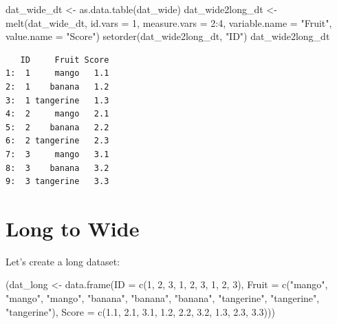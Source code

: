 \documentclass[
]{book}
\newenvironment{Shaded}{\begin{snugshade}}{\end{snugshade}}
\newcommand{\AttributeTok}[1]{\textcolor[rgb]{0.77,0.63,0.00}{#1}}
\newcommand{\DecValTok}[1]{\textcolor[rgb]{0.00,0.00,0.81}{#1}}
\newcommand{\FloatTok}[1]{\textcolor[rgb]{0.00,0.00,0.81}{#1}}
\newcommand{\FunctionTok}[1]{\textcolor[rgb]{0.00,0.00,0.00}{#1}}
\newcommand{\NormalTok}[1]{#1}
\newcommand{\OtherTok}[1]{\textcolor[rgb]{0.56,0.35,0.01}{#1}}
\newcommand{\SpecialCharTok}[1]{\textcolor[rgb]{0.00,0.00,0.00}{#1}}
\newcommand{\StringTok}[1]{\textcolor[rgb]{0.31,0.60,0.02}{#1}}
\begin{document}
\begin{Shaded}
\begin{Highlighting}[]
\NormalTok{dat\_wide\_dt }\OtherTok{\textless{}{-}} \FunctionTok{as.data.table}\NormalTok{(dat\_wide)}
\NormalTok{dat\_wide2long\_dt }\OtherTok{\textless{}{-}} \FunctionTok{melt}\NormalTok{(dat\_wide\_dt,}
                         \AttributeTok{id.vars =} \DecValTok{1}\NormalTok{,}
                         \AttributeTok{measure.vars =} \DecValTok{2}\SpecialCharTok{:}\DecValTok{4}\NormalTok{,}
                         \AttributeTok{variable.name =} \StringTok{"Fruit"}\NormalTok{,}
                         \AttributeTok{value.name =} \StringTok{"Score"}\NormalTok{)}
\FunctionTok{setorder}\NormalTok{(dat\_wide2long\_dt, }\StringTok{"ID"}\NormalTok{)}
\NormalTok{dat\_wide2long\_dt}
\end{Highlighting}
\end{Shaded}

\begin{verbatim}
   ID     Fruit Score
1:  1     mango   1.1
2:  1    banana   1.2
3:  1 tangerine   1.3
4:  2     mango   2.1
5:  2    banana   2.2
6:  2 tangerine   2.3
7:  3     mango   3.1
8:  3    banana   3.2
9:  3 tangerine   3.3
\end{verbatim}

\hypertarget{long-to-wide}{%
\section{Long to Wide}\label{long-to-wide}}

Let's create a long dataset:

\begin{Shaded}
\begin{Highlighting}[]
\NormalTok{(dat\_long }\OtherTok{\textless{}{-}} \FunctionTok{data.frame}\NormalTok{(}\AttributeTok{ID =} \FunctionTok{c}\NormalTok{(}\DecValTok{1}\NormalTok{, }\DecValTok{2}\NormalTok{, }\DecValTok{3}\NormalTok{, }\DecValTok{1}\NormalTok{, }\DecValTok{2}\NormalTok{, }\DecValTok{3}\NormalTok{, }\DecValTok{1}\NormalTok{, }\DecValTok{2}\NormalTok{, }\DecValTok{3}\NormalTok{),}
                       \AttributeTok{Fruit =} \FunctionTok{c}\NormalTok{(}\StringTok{"mango"}\NormalTok{, }\StringTok{"mango"}\NormalTok{, }\StringTok{"mango"}\NormalTok{, }
                                 \StringTok{"banana"}\NormalTok{, }\StringTok{"banana"}\NormalTok{, }\StringTok{"banana"}\NormalTok{, }
                                 \StringTok{"tangerine"}\NormalTok{, }\StringTok{"tangerine"}\NormalTok{, }\StringTok{"tangerine"}\NormalTok{),}
                       \AttributeTok{Score =} \FunctionTok{c}\NormalTok{(}\FloatTok{1.1}\NormalTok{, }\FloatTok{2.1}\NormalTok{, }\FloatTok{3.1}\NormalTok{, }\FloatTok{1.2}\NormalTok{, }\FloatTok{2.2}\NormalTok{, }\FloatTok{3.2}\NormalTok{, }\FloatTok{1.3}\NormalTok{, }\FloatTok{2.3}\NormalTok{, }\FloatTok{3.3}\NormalTok{)))}
\end{Highlighting}
\end{Shaded}
\end{document}
